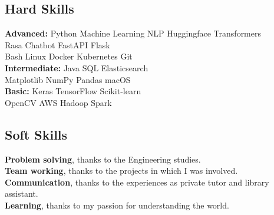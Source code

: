 \documentclass[]{deedy-resume-openfont}
\begin{document}
\begin{minipage}[t]{0.33\textwidth}
\subsection{Hard Skills}
\textbf{Advanced:} Python \textbullet{} Machine Learning
NLP \textbullet{} Huggingface Transformers \\
Rasa Chatbot \textbullet{} FastAPI \textbullet{} Flask \\
Bash \textbullet{} Linux \textbullet{} Docker \textbullet{} Kubernetes \textbullet{} Git \\
\textbf{Intermediate:} Java \textbullet{} SQL \textbullet{} Elasticsearch \\
Matplotlib \textbullet{} NumPy \textbullet{} Pandas \textbullet{} macOS \\
\textbf{Basic:} Keras \textbullet{} TensorFlow \textbullet{} Scikit-learn \\
OpenCV \textbullet{} AWS \textbullet{} Hadoop \textbullet{} Spark
\sectionsep

\subsection{Soft Skills}
\textbf{Problem solving}, thanks to the Engineering studies. \\
\textbf{Team working}, thanks to the projects in which I was involved. \\
\textbf{Communication}, thanks to the experiences as private tutor and library assistant. \\
\textbf{Learning}, thanks to my passion for understanding the world. \\





\end{minipage}
\end{document}
